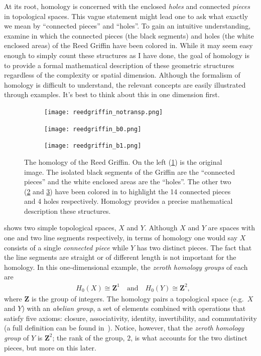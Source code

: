 At its root, homology is concerned with the enclosed \textit{holes} and connected \textit{pieces} in topological spaces. This vague statement might lead one to ask what exactly we mean by ``connected pieces'' and ``holes''. To gain an intuitive understanding, examine  in which the connected pieces (the black segments) and holes (the white enclosed areas) of the Reed Griffin have been colored in. While it may seem easy enough to simply count these structures as I have done, the goal of homology is to provide a formal mathematical description of these geometric structures regardless of the complexity or spatial dimension. Although the formalism of homology is difficult to understand, the relevant concepts are easily illustrated through examples. It's best to think about this in one dimension first.
%
\begin{figure}[h]
	\centering
	\begin{subfigure}[b]{0.3\textwidth}
		\texttt{[image: reedgriffin\_notransp.png]}
		\caption{} \label{fig:reedgriffin_orig}
	\end{subfigure} \quad
	\begin{subfigure}[b]{0.3\textwidth}
		\texttt{[image: reedgriffin\_b0.png]}
		\caption{} \label{fig:reedgriffin_b0}
	\end{subfigure} \quad
	\begin{subfigure}[b]{0.3\textwidth}
		\texttt{[image: reedgriffin\_b1.png]}
		\caption{} \label{fig:reedgriffin_b1}
	\end{subfigure}
	\caption{The homology of the Reed Griffin. On the left (\ref{fig:reedgriffin_orig}) is the original image. The isolated black segments of the Griffin are the ``connected pieces'' and the white enclosed areas are the ``holes''. The other two (\ref{fig:reedgriffin_b0} and \ref{fig:reedgriffin_b1}) have been colored in to highlight the 14 connected pieces and 4 holes respectively. Homology provides a precise mathematical description these structures.} \label{fig:reedgriffin}
\end{figure}
%

 shows two simple topological spaces, $X$ and $Y$. Although $X$ and $Y$ are spaces with one and two line segments respectively, in terms of homology one would say $X$ consists of a single \textit{connected piece} while $Y$ has two distinct pieces. The fact that the line segments are straight or of different length is not important for the homology. In this one-dimensional example, the \textit{zeroth homology groups} of each are
%
\begin{align}
	& H_0(X) \cong \mathbf{Z}^1 \quad \text{and} \quad H_0(Y) \cong \mathbf{Z}^2,
	\label{eq:homology1d}
\end{align}
%
where $\mathbf{Z}$ is the group of integers. The homology pairs a topological space (e.g.\ $X$ and $Y$) with an \textit{abelian group}, a set of elements combined with operations that satisfy five axioms: closure, associativity, identity, invertibility, and commutativity (a full definition can be found in~). Notice, however, that the \textit{zeroth homology group} of $Y$ is $\mathbf{Z}^2$; the rank of the group, $2$, is what accounts for the two distinct pieces, but more on this later.

